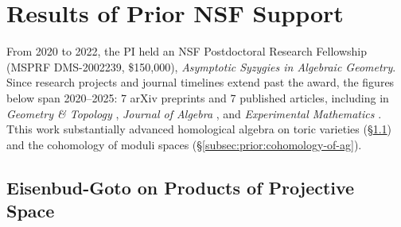 \documentclass[11pt,reqno]{amsart}
\theoremstyle{remark}
\begin{document}
\section{Results of Prior NSF Support}\label{sec:prior-work}

From 2020 to 2022, the PI held an NSF Postdoctoral Research Fellowship (MSPRF DMS-2002239, \$150,000), \textit{Asymptotic Syzygies in Algebraic Geometry}. Since research projects and journal timelines extend past the award, the figures below span 2020--2025: 7 arXiv preprints \cite{BCEGLY22,bruceHellerSayrafi26,bruceHellerSayrafi22,brandtBruceCorey23,BBCMMW24,ABBCV25,bruceHellerSayrafiSeceleanu25} and 7 published articles, including in \textit{Geometry \& Topology} \cite{BBCMMW24}, \textit{Journal of Algebra} \cite{BCEGLY22}, and \textit{Experimental Mathematics} \cite{BEGY20}. Tthis work substantially advanced homological algebra on toric varieties (\S\ref{subsec:prior:homological-algebra-on-toric}) and the cohomology of moduli spaces (\S\ref{subsec:prior:cohomology-of-ag}).




\subsection{Eisenbud-Goto on Products of Projective Space}\label{subsec:prior:homological-algebra-on-toric}
\end{document}
